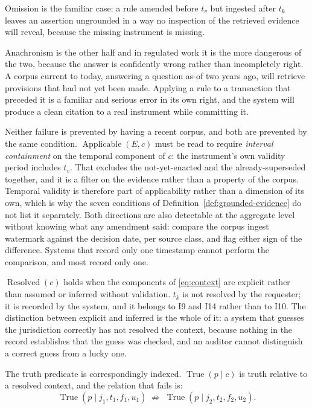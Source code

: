 \documentclass[11pt]{article}
\newcommand{\Applicable}{\operatorname{Applicable}}
\newcommand{\Resolved}{\operatorname{Resolved}}
\newcommand{\nentails}{\;\not\Rightarrow\;}
\newcommand{\True}{\operatorname{True}}
\theoremstyle{plain}
\theoremstyle{definition}
\begin{document}
Omission is the familiar case: a rule amended before $t_v$ but ingested after $t_k$
leaves an assertion ungrounded in a way no inspection of the retrieved evidence will
reveal, because the missing instrument is missing.

Anachronism is the other half and in regulated work it is the more dangerous of the two,
because the answer is confidently wrong rather than incompletely right. A corpus current
to today, answering a question as-of two years ago, will retrieve provisions that had
not yet been made. Applying a rule to a transaction that preceded it is a familiar and
serious error in its own right, and the system will produce a clean citation to a real
instrument while committing it.

Neither failure is prevented by having a recent corpus, and both are prevented by the
same condition. $\Applicable(E, c)$ must be read to require \emph{interval containment}
on the temporal component of $c$: the instrument's own validity period includes $t_v$.
That excludes the not-yet-enacted and the already-superseded together, and it is a
filter on the evidence rather than a property of the corpus. Temporal validity is
therefore part of applicability rather than a dimension of its own, which is why the
seven conditions of Definition~\ref{def:grounded-evidence} do not list it separately. Both directions are also detectable at the aggregate level
without knowing what any amendment said: compare the corpus ingest watermark against
the decision date, per source class, and flag either sign of the difference. Systems that record only one timestamp cannot
perform the comparison, and most record only one.

$\Resolved(c)$ holds when the components of \eqref{eq:context} are explicit rather
than assumed or inferred without validation. $t_k$ is not resolved by the requester;
it is recorded by the system, and it belongs to I9 and I14 rather than to I10. The distinction between explicit and inferred is the whole of
it: a system that guesses the jurisdiction correctly has not resolved the context,
because nothing in the record establishes that the guess was checked, and an
auditor cannot distinguish a correct guess from a lucky one.

The truth predicate is correspondingly indexed. $\True(p \mid c)$ is truth relative
to a resolved context, and the relation that fails is:
\begin{equation}
  \True(p \mid j_1, t_1, f_1, u_1)
  \nentails
  \True(p \mid j_2, t_2, f_2, u_2).
  \label{eq:no-transfer}
\end{equation}
\end{document}
